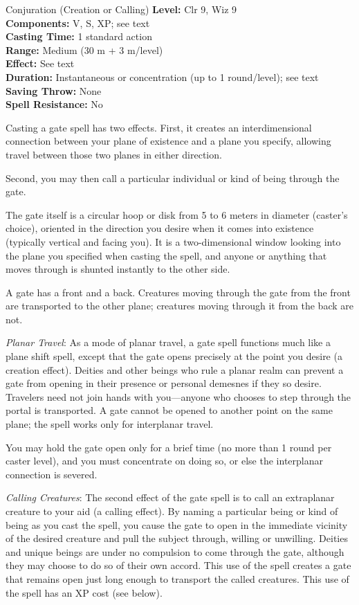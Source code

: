 {Conjuration (Creation or Calling)}
{
	\textbf{Level:}
	Clr 9, Wiz 9\\
	\textbf{Components:}
	V, S, XP; see text\\
	\textbf{Casting Time:}
	1 standard action\\
	\textbf{Range:}
	Medium (30 m + 3 m/level)\\
	\textbf{Effect:}
	See text\\
	\textbf{Duration:}
	Instantaneous or concentration (up to 1 round/level); see text\\
	\textbf{Saving Throw:}
	None\\
	\textbf{Spell Resistance:}
	No\\
}
{
	Casting a gate spell has two effects. First, it creates an interdimensional connection between your plane of existence and a plane you specify, allowing travel between those two planes in either direction.

	Second, you may then call a particular individual or kind of being through the gate.

	The gate itself is a circular hoop or disk from 5 to 6 meters in diameter (caster's choice), oriented in the direction you desire when it comes into existence (typically vertical and facing you). It is a two-dimensional window looking into the plane you specified when casting the spell, and anyone or anything that moves through is shunted instantly to the other side.

	A gate has a front and a back. Creatures moving through the gate from the front are transported to the other plane; creatures moving through it from the back are not.

	\textit{Planar Travel}:
	As a mode of planar travel, a gate spell functions much like a plane shift spell, except that the gate opens precisely at the point you desire (a creation effect). Deities and other beings who rule a planar realm can prevent a gate from opening in their presence or personal demesnes if they so desire. Travelers need not join hands with you---anyone who chooses to step through the portal is transported. A gate cannot be opened to another point on the same plane; the spell works only for interplanar travel.

	You may hold the gate open only for a brief time (no more than 1 round per caster level), and you must concentrate on doing so, or else the interplanar connection is severed.

	\textit{Calling Creatures}:
	The second effect of the gate spell is to call an extraplanar creature to your aid (a calling effect). By naming a particular being or kind of being as you cast the spell, you cause the gate to open in the immediate vicinity of the desired creature and pull the subject through, willing or unwilling. Deities and unique beings are under no compulsion to come through the gate, although they may choose to do so of their own accord. This use of the spell creates a gate that remains open just long enough to transport the called creatures. This use of the spell has an XP cost (see below).

}
